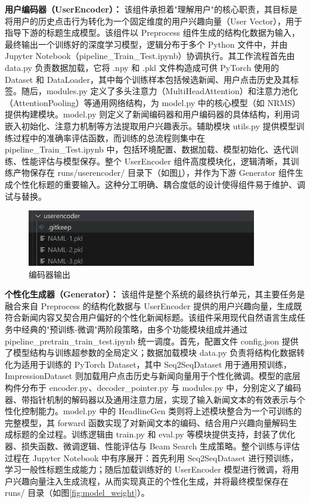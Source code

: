 \documentclass[10pt,a4paper]{article}
\begin{document}
\textbf{用户编码器（UserEncoder）：}
该组件承担着"理解用户"的核心职责，其目标是将用户的历史点击行为转化为一个固定维度的用户兴趣向量（User Vector），用于指导下游的标题生成模型。该组件以 Preprocess 组件生成的结构化数据为输入，最终输出一个训练好的深度学习模型，逻辑分布于多个 Python 文件中，并由 Jupyter Notebook（pipeline\_Train\_Test.ipynb）协调执行。其工作流程首先由 data.py 负责数据加载，它将 .npy 和 .pkl 文件构造成可供 PyTorch 使用的 Dataset 和 DataLoader，其中每个训练样本包括候选新闻、用户点击历史及其标签。随后，modules.py 定义了多头注意力（MultiHeadAttention）和注意力池化（AttentionPooling）等通用网络结构，为 model.py 中的核心模型（如 NRMS）提供构建模块。model.py 则定义了新闻编码器和用户编码器的具体结构，利用词嵌入初始化、注意力机制等方法提取用户兴趣表示。辅助模块 utils.py 提供模型训练过程中的准确率评估函数，而训练的总流程则集中在 pipeline\_Train\_Test.ipynb 中，包括环境配置、数据加载、模型初始化、迭代训练、性能评估与模型保存。整个 UserEncoder 
组件高度模块化，逻辑清晰，其训练产物保存在 runs/userencoder/ 目录下（如图\ref{fig:user_encode}），并作为下游 Generator 组件生成个性化标题的重要输入。这种分工明确、耦合度低的设计使得组件易于维护、调试与替换。

\begin{figure}[H]
  \centering
  \includegraphics[width=10cm]{fig/user_encode.png}
  \caption{编码器输出}\label{fig:user_encode}
\end{figure}

\textbf{个性化生成器（Generator）：}
该组件是整个系统的最终执行单元，其主要任务是融合来自 Preprocess 的结构化数据与 UserEncoder 提供的用户兴趣向量，生成既符合新闻内容又契合用户偏好的个性化新闻标题。该组件采用现代自然语言生成任务中经典的"预训练-微调"两阶段策略，由多个功能模块组成并通过 pipeline\_pretrain\_train\_test.ipynb 统一调度。首先，配置文件 config.json 提供了模型结构与训练超参数的全局定义；数据加载模块 data.py 负责将结构化数据转化为适用于训练的 PyTorch Dataset，其中 Seq2SeqDataset 用于通用预训练，ImpressionDataset 则加载用户点击历史与新闻向量用于个性化微调。模型的底层构件分布于 encoder.py、decoder\_pointer.py 与 modules.py 中，分别定义了编码器、带指针机制的解码器以及通用注意力层，实现了输入新闻文本的有效表示与个性化控制能力。model.py 中的 HeadlineGen 类则将上述模块整合为一个可训练的完整模型，其 forward 函数实现了对新闻文本的编码、结合用户兴趣向量解码生成标题的全过程。训练逻辑由 train.py 和 eval.py 等模块提供支持，封装了优化器、损失函数、微调逻辑、性能评估与 Beam Search 生成策略。整个训练与评估过程在 Jupyter Notebook 中有序展开：首先利用 Seq2SeqDataset 进行预训练，学习一般性标题生成能力；随后加载训练好的 UserEncoder 模型进行微调，将用户兴趣向量注入生成流程，从而实现真正的个性化生成，并将最终模型保存在 runs/ 目录（如图\ref{fig:model_weight}）。
\end{document}
